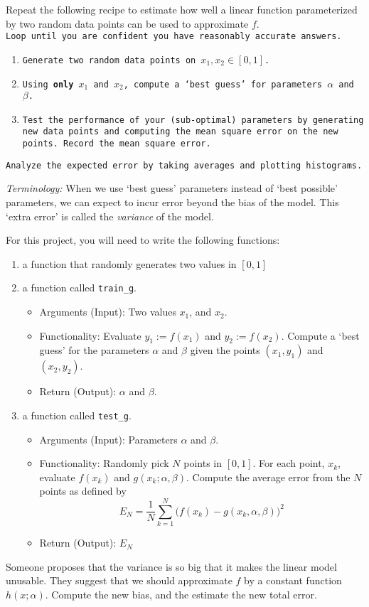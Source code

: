 Repeat the following recipe to estimate how well a linear function parameterized by two random data points can be used to approximate $f$.\\
\texttt{Loop until you are confident you have reasonably accurate answers.}
\begin{enumerate}\setlength{\itemsep}{0pt}
    \item \texttt{Generate two random data points on $x_1, x_2 \in [0,1]$.}
    \item \texttt{Using \textbf{only} $x_1$ and $x_2$, compute a `best guess' for parameters $\alpha$ and $\beta$.}
    \item \texttt{Test the performance of your (sub-optimal) parameters by generating new data points and computing the mean square error on the new points. Record the mean square error.}
\end{enumerate}
\texttt{Analyze the expected error by taking averages and plotting histograms.}

\textit{Terminology:} When we use `best guess' parameters instead of `best possible' parameters, we can expect to incur error beyond the bias of the model. This `extra error' is called the \textit{variance} of the model.  

For this project, you will need to write the following functions:
\begin{enumerate}
    \item a function that randomly generates two values in $[0,1]$
    \item a function called \texttt{train\_g}.
    \begin{itemize}
        \item Arguments (Input): Two values $x_1$, and $x_2$.
        \item Functionality: Evaluate $y_1:=f(x_1)$ and $y_2:= f(x_2)$. Compute a `best guess' for the parameters $ \alpha$ and $ \beta$ given the points $(x_1,y_1)$ and $(x_2,y_2)$.
        \item Return (Output): $ \alpha$ and $ \beta$.
    \end{itemize}
    \item a function called \texttt{test\_g}.
    \begin{itemize}
        \item Arguments (Input): Parameters $ \alpha$ and $ \beta$.
        \item Functionality: Randomly pick $N$ points in $[0,1]$. For each point, $x_k$, evaluate $f(x_k)$ and $g(x_k;  \alpha,  \beta)$. Compute the average error from the $N$ points as defined by $$E_N = \frac{1}{N}\sum_{k = 1}^N \Big(f(x_k) - g(x_k, \alpha, \beta)\Big)^2$$
        \item Return (Output): $E_N$   
    \end{itemize}
\end{enumerate}

Someone proposes that the variance is so big that it makes the linear model unusable.  They suggest that we should approximate $f$ by a constant function  $h(x;\alpha)$. Compute the new bias, and the estimate the new total error. 
